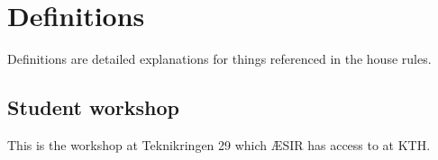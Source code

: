 
\section*{Definitions}

Definitions are detailed explanations for things referenced in the house rules.

\subsection*{Student workshop}
This is the workshop at Teknikringen 29 which ÆSIR has access to at KTH.